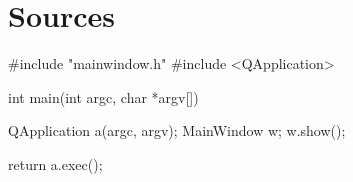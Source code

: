 \section{Sources}
%
\begin{cpp}
	#include "mainwindow.h"
	#include <QApplication>
	
	int main(int argc, char *argv[])
	{
		QApplication a(argc, argv);
		MainWindow w;
		w.show();
		
		return a.exec();
	}
\end{cpp}